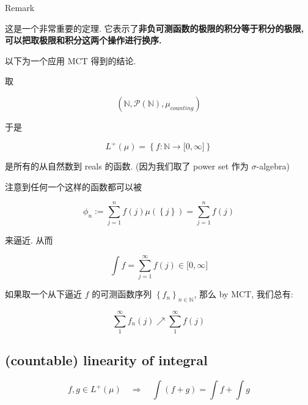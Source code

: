 \documentclass{qlnotes-export}
\begin{document}
\begin{qlremark}{Remark}

这是一个非常重要的定理. 它表示了\textbf{非负可测函数的极限的积分等于积分的极限, 可以把取极限和积分这两个操作进行换序.}

\end{qlremark}

以下为一个应用 MCT 得到的结论.

\begin{example}

取

\[({\mathbb{N}},\mathcal{P}({\mathbb{N}}),\mu_{counting})\]

于是

\[L^{+}(\mu) = \left\{ {f:{\mathbb{N}}\rightarrow\lbrack 0,\infty\rbrack} \right\}\]

是所有的从自然数到 reals 的函数. (因为我们取了 power set 作为 \(\sigma\)-algebra)

注意到任何一个这样的函数都可以被

\[\phi_{n} := \sum\limits_{j = 1}^{n}f(j)\mu(\left\{ j \right\}) = \sum\limits_{j = 1}^{n}f(j)\]

来逼近. 从而

\[\int f = \sum\limits_{j = 1}^{\infty}f(j) \in \lbrack 0,\infty\rbrack\]

如果取一个从下逼近 \(f\) 的可测函数序列 \(\left\{ f_{n} \right\}_{n \in {\mathbb{N}}}\), 那么 by MCT, 我们总有:

\[\sum\limits_{1}^{\infty}f_{n}(j)\operatorname{\nearrow ︎}\sum\limits_{1}^{\infty}f(j)\]

\end{example}

\subsection{(countable) linearity of integral}\label{countable-linearity-of-integral}

\begin{corollary}

\[f,g \in L^{+}(\mu)\quad\Rightarrow\quad\int(f + g) = \int f + \int g\]

\end{corollary}
\end{document}
